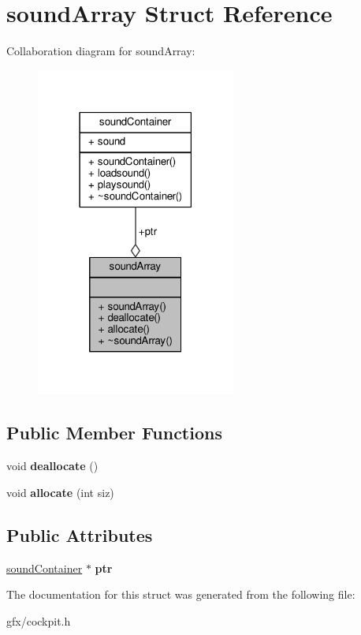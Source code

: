 \hypertarget{structsoundArray}{}\section{sound\+Array Struct Reference}
\label{structsoundArray}


Collaboration diagram for sound\+Array\+:
\nopagebreak
\begin{figure}[H]
\begin{center}
\leavevmode
\includegraphics[width=186pt]{df/d32/structsoundArray__coll__graph}
\end{center}
\end{figure}
\subsection*{Public Member Functions}
\begin{DoxyCompactItemize}
\item 
void {\bfseries deallocate} ()\hypertarget{structsoundArray_aed25ce5bb732dce5d7ea9bc260324f95}{}\label{structsoundArray_aed25ce5bb732dce5d7ea9bc260324f95}

\item 
void {\bfseries allocate} (int siz)\hypertarget{structsoundArray_aa5ac86d904fc0b17aba2645a92af8a55}{}\label{structsoundArray_aa5ac86d904fc0b17aba2645a92af8a55}

\end{DoxyCompactItemize}
\subsection*{Public Attributes}
\begin{DoxyCompactItemize}
\item 
\hyperlink{structsoundContainer}{sound\+Container} $\ast$ {\bfseries ptr}\hypertarget{structsoundArray_a15e80ff43cdac60c53cf9d901a1a79f2}{}\label{structsoundArray_a15e80ff43cdac60c53cf9d901a1a79f2}

\end{DoxyCompactItemize}


The documentation for this struct was generated from the following file\+:\begin{DoxyCompactItemize}
\item 
gfx/cockpit.\+h\end{DoxyCompactItemize}
